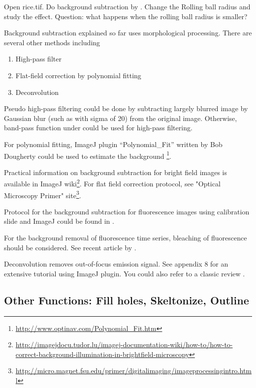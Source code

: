 \begin{indentexercise}{1}
Open rice.tif. Do background
subtraction by .
Change the Rolling ball radius and study the effect. Question: what
happens when the rolling ball radius is smaller?
\end{indentexercise}

Background subtraction explained so far uses morphological processing. 
There are several other methods including
 
\begin{enumerate}
  \item High-pass filter
  \item Flat-field correction by polynomial fitting
  \item Deconvolution
\end{enumerate}

Pseudo high-pass filtering could be done by subtracting 
largely blurred image by Gaussian blur (such as with sigma of 20)  
from the original image. Otherwise, band-pass function under  could be used for high-pass filtering.  

For polynomial fitting, ImageJ plugin ``Polynomial\_Fit'' written by Bob
Dougherty could be used to estimate the background
\footnote{\url{http://www.optinav.com/Polynomial_Fit.htm}}.

Practical information on background subtraction for bright field images is
available in ImageJ wiki\footnote{\url{http://imagejdocu.tudor.lu/imagej-documentation-wiki/how-to/how-to-correct-background-illumination-in-brightfield-microscopy}}. 
For flat field correction protocol, see "Optical Microscopy Primer"
site\footnote{\url{http://micro.magnet.fsu.edu/primer/digitalimaging/imageprocessingintro.html}}.

Protocol for the background subtraction for fluorescence
images using calibration slide and ImageJ could be found in
 \cite{MiuraME2005}.

For the background removal of fluorescence time series, bleaching of
fluorescence should be considered. See recent article by
\cite{Schwarzfischer2011}.

Deconvolution removes out-of-focus emission signal. See appendix 8 for an
extensive tutorial using ImageJ plugin. You could also refer to a classic review
\citep{Wallace2001}.

\subsection{Other Functions: Fill holes, Skeltonize, Outline}

